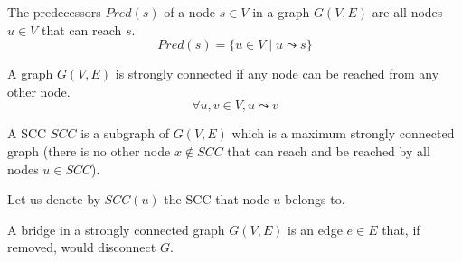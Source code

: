 \begin{definition}[Predecessors] The predecessors $Pred(s)$ of a node $s \in V$ in a graph $G(V,E)$ are all nodes $u \in V$ that can reach $s$.
    \begin{equation*}
        Pred(s) = \{u \in V \mid u \leadsto s\}
    \end{equation*}
\end{definition}
\begin{definition}
    A graph $G(V, E)$ is strongly connected if any node can be reached from any other node.
    \begin{equation*}
        \forall u, v \in V, u \leadsto v
    \end{equation*}
\end{definition}
\begin{definition}
    A \acrlong*{SCC} $SCC$ is a subgraph of $G(V, E)$ which is a maximum strongly connected graph (there is no other node $x \not \in SCC$ that can reach and be reached by all nodes $u \in SCC$).
\end{definition}
Let us denote by $SCC(u)$ the \acrfull{SCC} that node $u$ belongs to.
\begin{definition}[Bridge]
    A bridge in a strongly connected graph $G(V,E)$ is an edge $e \in E$ that, if removed, would disconnect $G$.
\end{definition}
